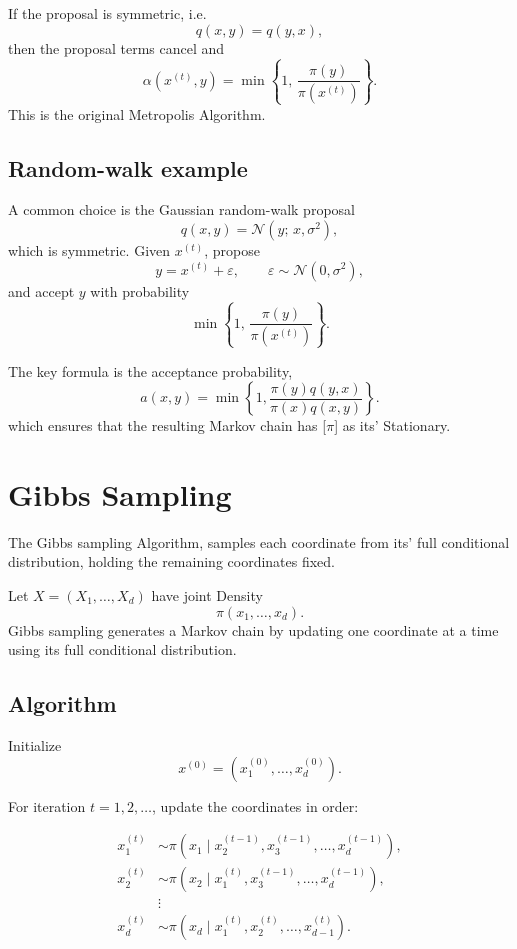 \documentclass[a4paper, 10pt, onepage]{elegantbook}
\begin{document}
{If the proposal is symmetric, i.e.
\[
q(x,y)=q(y,x),
\]
then the proposal terms cancel and
\[
\alpha\!\left(x^{(t)},y\right)
=
\min\left\{
1,\,
\frac{\pi(y)}{\pi(x^{(t)})}
\right\}.
\]
This is the original Metropolis Algorithm.

\subsection{Random-walk example}

A common choice is the Gaussian random-walk proposal
\[
q(x,y)
=
\mathcal N\!\left(y;\,x,\sigma^2\right),
\]
which is symmetric. Given \(x^{(t)}\), propose
\[
y=x^{(t)}+\varepsilon,
\qquad
\varepsilon\sim\mathcal N(0,\sigma^2),
\]
and accept \(y\) with probability
\[
\min\left\{
1,\,
\frac{\pi(y)}{\pi(x^{(t)})}
\right\}.
\]

The key formula is the acceptance probability,
\[
a(x,y)=\min\left\{1,\frac{\pi(y)q(y,x)}{\pi(x)q(x,y)}\right\}.
\]
which ensures that the resulting Markov chain has [$\pi$] as its' Stationary.

\newpage



\section{Gibbs Sampling}


The Gibbs sampling Algorithm, samples each coordinate from its' full conditional distribution, holding the remaining 
coordinates fixed.

Let \(X=(X_1,\ldots,X_d)\) have joint Density
\[
\pi(x_1,\ldots,x_d).
\]
Gibbs sampling generates a Markov chain by updating one coordinate at a time
using its full conditional distribution.

\subsection{Algorithm}

Initialize
\[
x^{(0)}=\left(x_1^{(0)},\ldots,x_d^{(0)}\right).
\]

For iteration \(t=1,2,\ldots\), update the coordinates in order:

\begin{align}
x_1^{(t)}
&\sim
\pi\!\left(x_1\mid x_2^{(t-1)},x_3^{(t-1)},\ldots,x_d^{(t-1)}\right),\\[4pt]
x_2^{(t)}
&\sim
\pi\!\left(x_2\mid x_1^{(t)},x_3^{(t-1)},\ldots,x_d^{(t-1)}\right),\\[4pt]
&\vdots\\[4pt]
x_d^{(t)}
&\sim
\pi\!\left(x_d\mid x_1^{(t)},x_2^{(t)},\ldots,x_{d-1}^{(t)}\right).
\end{align}

}
\end{document}
